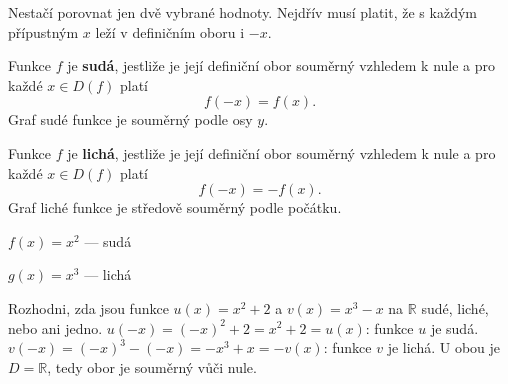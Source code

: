 \documentclass[11pt,a4paper]{article}
\begin{document}

Nestačí porovnat jen dvě vybrané hodnoty. Nejdřív musí platit,
že s každým přípustným $x$ leží v definičním oboru i $-x$.

\begin{definiceBox}[title={Definice - Sudá funkce}]
Funkce $f$ je \textbf{sudá}, jestliže je její definiční obor
souměrný vzhledem k nule a pro každé $x\in D(f)$ platí
\[
f(-x)=f(x).
\]
Graf sudé funkce je souměrný podle osy $y$.
\end{definiceBox}
\begin{definiceBox}[title={Definice - Lichá funkce}]
Funkce $f$ je \textbf{lichá}, jestliže je její definiční obor
souměrný vzhledem k nule a pro každé $x\in D(f)$ platí
\[
f(-x)=-f(x).
\]
Graf liché funkce je středově souměrný podle počátku.
\end{definiceBox}

\begin{center}
\begin{minipage}{.43\linewidth}\centering
{}
\par\small $f(x)=x^2$ — sudá
\end{minipage}\hfill
\begin{minipage}{.43\linewidth}\centering
{}
\par\small $g(x)=x^3$ — lichá
\end{minipage}
\end{center}

\begin{prikladReseniBox}[title={Příklad 2}]
Rozhodni, zda jsou funkce $u(x)=x^2+2$ a $v(x)=x^3-x$
na $\mathbb R$ sudé, liché, nebo ani jedno.
\tcblower
$u(-x)=(-x)^2+2=x^2+2=u(x)$: funkce $u$ je sudá.
$v(-x)=(-x)^3-(-x)=-x^3+x=-v(x)$: funkce $v$ je lichá.
U obou je $D=\mathbb R$, tedy obor je souměrný vůči nule.
\end{prikladReseniBox}
\end{document}
